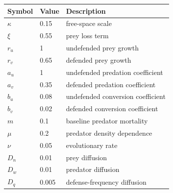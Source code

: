 \begin{tabular}{lll}
\toprule
Symbol & Value & Description \\
\midrule
$\kappa$ & 0.15 & free-space scale \\
$\xi$ & 0.55 & prey loss term \\
$r_u$ & 1 & undefended prey growth \\
$r_v$ & 0.65 & defended prey growth \\
$a_u$ & 1 & undefended predation coefficient \\
$a_v$ & 0.35 & defended predation coefficient \\
$b_u$ & 0.08 & undefended conversion coefficient \\
$b_v$ & 0.02 & defended conversion coefficient \\
$m$ & 0.1 & baseline predator mortality \\
$\mu$ & 0.2 & predator density dependence \\
$\nu$ & 0.05 & evolutionary rate \\
$D_n$ & 0.01 & prey diffusion \\
$D_w$ & 0.01 & predator diffusion \\
$D_q$ & 0.005 & defense-frequency diffusion \\
\bottomrule
\end{tabular}
